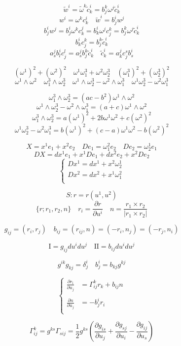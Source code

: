 \documentclass[12pt,a4paper]{article}
\begin{document}
\[
\tilde{w}^i = \tilde{\omega}^k\tilde{c}^i_k = b^k_j \omega^j \tilde{c}^i_k
\]
\[
w^i = \omega^kc^i_k \quad \tilde{w}^i = b^i_jw^j
\]
\[
b^i_jw^j = b^i_j\omega^kc^j_k =  b^i_k\omega^jc^k_j = b^k_j \omega^j \tilde{c}^i_k
\]
\[
b^i_kc^k_j = b^k_j \tilde{c}^i_k
\]
\[
a^j_sb^i_lc^l_j = a^j_sb^k_j \tilde{c}^i_k \quad \tilde{c}^i_k = a^j_kc^s_jb^i_s
\]

\[
(\omega^1)^2 + (\omega^2)^2 \quad
\omega^1\omega^3_1 + \omega^2\omega^3_2 \quad
(\omega^3_1)^2 + (\omega^3_2)^2
\]
\[
\omega^1 \wedge \omega^2 \quad \omega^3_1 \wedge \omega^3_2 \quad \omega^1 \wedge \omega^3_2 - \omega^2 \wedge \omega^3_1 \quad \omega^1\omega^3_2 - \omega^2\omega^3_1
\]

\[
 \omega^3_1 \wedge \omega^3_2  = (ac-b^2)\omega^1 \wedge \omega^2
\]
\[
\omega^1 \wedge \omega^3_2 - \omega^2 \wedge \omega^3_1= (a+c)\omega^1 \wedge \omega^2
\]
\[
\omega^3_1 \wedge \omega^3_2 = a(\omega^1)^2 + 2b\omega^1\omega^2 + c(\omega^2)^2
\]
\[
\omega^1\omega^3_2 - \omega^2\omega^3_1= b(\omega^1)^2 + (c-a)\omega^1\omega^2 -b(\omega^2)^2
\]

\[
X = x^1 e_1 + x^2 e_2 \quad De_1 = \omega^2_1 e_2 \quad De_2 = \omega^1_2 e_1
\]
\[
DX = dx^1 e_1 + x^1 De_1 + dx^2 e_2 + x^2 De_2
\]
\[
\begin{cases}
Dx^1 = dx^1 + x^2\omega^1_2 \\
Dx^2 = dx^2 + x^1\omega^2_1 \\
\end{cases}
\]



\[
S: r = r(u^1,u^2)
\]
\[
\{r;r_1,r_2,n\} \quad r_i = \frac{\partial r}{\partial u^i} \quad n = \frac{r_1 \times r_2}{|r_1 \times r_2|}
\]

\[
g_{ij} = (r_i,r_j) \quad b_{ij} = (r_{ij},n) = (-r_i,n_j) = (-r_j,n_i)
\]

\[
\mathrm{I} = g_{ij}du^idu^j \quad \mathrm{II} = b_{ij}du^idu^j
\]

\[
g^{ik}g_{kj} = \delta^i_j \quad b^i_j = b_{kj}g^{kj}
\]

\[
\begin{cases}
\displaystyle \frac{\partial r_i}{\partial u_j} &= \Gamma^k_{ij} r_k + b_{ij} n \\
\\
\displaystyle \frac{\partial n}{\partial u_j} &= -b^i_jr_i \\
\end{cases}
\]

\[
\Gamma^k_{ij} = g^{ks}\Gamma_{sij} = \frac{1}{2}g^{ks}\left( \frac{\partial g_{is}}{\partial u_j}+ \frac{\partial g_{sj}}{\partial u_i} -  \frac{\partial g_{ij}}{\partial u_s}\right)
\]
\end{document}
